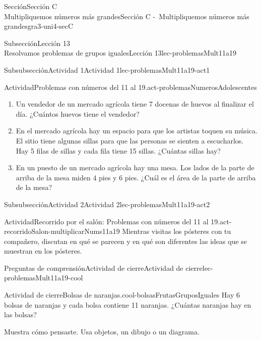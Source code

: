 \begin{sectionptx}{Sección}{{\Large Sección C\\}Multipliquemos números más grandes}{}{Sección C -~Multipliquemos números más grandes}{}{}{gra3-uni4-secC}
\begin{subsectionptx}{Subsección}{{\normalsize Lección 13\\[-0.05cm]}Resolvamos problemas de grupos iguales}{}{Lección 13}{}{}{lec-problemasMult11a19}
\begin{subsubsectionptx}{Subsubsección}{Actividad 1}{}{Actividad 1}{}{}{lec-problemasMult11a19-act1}
\begin{activity}{Actividad}{Problemas con números del 11 al 19.}{act-problemasNumerosAdolescentes}
\begin{sidebyside}{2}{0.05}{0.05}{0.1}
\end{sidebyside}%
%
\begin{enumerate}
\item{}Un vendedor de un mercado agrícola tiene 7 docenas de huevos al finalizar el día. ¿Cuántos huevos tiene el vendedor?%
\item{}En el mercado agrícola hay un espacio para que los artistas toquen su música. El sitio tiene algunas sillas para que las personas se sienten a escucharlos. Hay 5 filas de sillas y cada fila tiene 15 sillas. ¿Cuántas sillas hay?%
\item{}En un puesto de un mercado agrícola hay una mesa. Los lados de la parte de arriba de la mesa miden 4 pies y 6 pies. ¿Cuál es el área de la parte de arriba de la mesa?%
\end{enumerate}
\end{activity}%
\end{subsubsectionptx}
%
%
\typeout{************************************************}
\typeout{************************************************}
%
\begin{subsubsectionptx}{Subsubsección}{Actividad 2}{}{Actividad 2}{}{}{lec-problemasMult11a19-act2}
\begin{activity}{Actividad}{Recorrido por el salón: Problemas con números del 11 al 19.}{act-recorridoSalon-multiplicarNums11a19}%
Mientras visitas los pósteres con tu compañero, discutan en qué se parecen y en qué son diferentes las ideas que se muestran en los pósteres.%
\end{activity}%
\end{subsubsectionptx}
%
%
\typeout{************************************************}
\typeout{************************************************}
%
\begin{reading-questions-subsubsection}{Preguntas de comprensión}{Actividad de cierre}{}{Actividad de cierre}{}{}{lec-problemasMult11a19-cool}
\begin{project}{Actividad de cierre}{Bolsas de naranjas.}{cool-bolsasFrutasGruposIguales}%
Hay 6 bolsas de naranjas y cada bolsa contiene 11 naranjas. ¿Cuántas naranjas hay en las bolsas?%
\par
Muestra cómo pensaste. Usa objetos, un dibujo o un diagrama.%
\end{project}%
\end{reading-questions-subsubsection}
\end{subsectionptx}
%
%
\typeout{************************************************}

\end{sectionptx}
